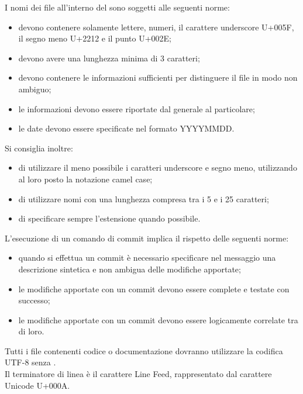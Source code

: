 					I nomi dei file all’interno del  sono soggetti alle seguenti norme:
					\begin{itemize}
						\item devono contenere solamente lettere, numeri, il carattere underscore U+005F, il segno meno U+2212 e il punto U+002E;
						\item devono avere una lunghezza minima di 3 caratteri;
						\item devono contenere le informazioni sufficienti per distinguere il file in modo non ambiguo;
						\item le informazioni devono essere riportate dal generale al particolare;
						\item le date devono essere specificate nel formato YYYYMMDD.
					\end{itemize}
					Si consiglia inoltre:
					\begin{itemize}
						\item di utilizzare il meno possibile i caratteri underscore e segno meno, utilizzando al loro posto la notazione camel case;
						\item di utilizzare nomi con una lunghezza compresa tra i 5 e i 25 caratteri;
						\item di specificare sempre l’estensione quando possibile.
					\end{itemize}
					L'esecuzione di un comando di commit implica il rispetto delle seguenti norme:
					\begin{itemize}
						\item quando si effettua un commit è necessario specificare nel messaggio una descrizione sintetica e non ambigua delle modifiche apportate;
						\item le modifiche apportate con un commit devono essere complete e testate con successo;
						\item le modifiche apportate con un commit devono essere logicamente correlate tra di loro.
					\end{itemize}
				\label{sec:CodificaFile}
					Tutti i file contenenti codice o documentazione dovranno utilizzare la codifica UTF-8 senza .\\
					Il terminatore di linea è il carattere Line Feed, rappresentato dal carattere Unicode U+000A.
		
